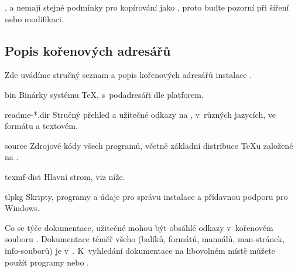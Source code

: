 \documentclass[\classoptions,slovak,english,czech]{\classname}
\begin{document}
\CTAN{},  a 
nemají stejné podmínky pro kopírování jako \TL{}, 
proto buďte pozorní při šíření nebo modifikaci.


\subsection{Popis kořenových adresářů \protect\TL{}}
\label{sec:tld}

Zde uvádíme stručný seznam a popis kořenových adresářů instalace \TL{}. 

\begin{ttdescription}
\item[bin] Binárky systému \TeX{}, s~podadresáři dle platforem.
%
\item[readme-*.dir] Stručný přehled a užitečné odkazy 
na \TL{}, v~různých jazycích, ve formátu \HTML{} a textovém.
%
\item[source] Zdrojové kódy všech programů, včetně základní distribuce
   \TeX{}u založené na \Webc{}.
%
\item[texmf-dist] Hlavní strom, viz  níže.
%
\item[tlpkg] Skripty, programy a údaje pro správu instalace a  
přídavnou podporu pro Windows.
\end{ttdescription}

\smallskip

Co se týče dokumentace, užitečné mohou 
být obsáhlé odkazy v~kořenovém souboru .
Dokumentace téměř všeho (balíků, formátů, manuálů, man-stránek, info-souborů) 
je v~.
K~vyhledání dokumentace na libovolném místě můžete 
použít programy  nebo . 
\end{document}
